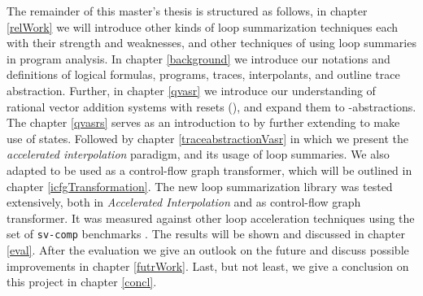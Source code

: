 The remainder of this master's thesis is structured as follows, in chapter \ref{relWork} we will introduce other kinds of loop summarization techniques each with their strength and weaknesses, and other techniques of using loop summaries in program analysis. In chapter \ref{background} we introduce our notations and definitions of logical formulas, programs, traces, interpolants, and outline trace abstraction. Further, in chapter \ref{qvasr} we introduce our understanding of rational vector addition systems with resets (\qvasr), and expand them to \qvasr-abstractions. The chapter \ref{qvasrs} serves as an introduction to \qvasrs by further extending \qvasr to make use of states. Followed by chapter \ref{traceabstractionVasr} in which we present the \textsl{accelerated interpolation} paradigm, and its usage of \qvasr loop summaries. We also adapted \qvasr to be used as a control-flow graph transformer, which will be outlined in chapter \ref{icfgTransformation}. The new loop summarization library was tested extensively, both in \textsl{Accelerated Interpolation} and as control-flow graph transformer. It was measured against other loop acceleration techniques using the set of \texttt{sv-comp} benchmarks \cite{svcomp}. The results will be shown and discussed in chapter \ref{eval}. After the evaluation we give an outlook on the future and discuss possible improvements in chapter \ref{futrWork}. Last, but not least, we give a conclusion on this project in chapter \ref{concl}.

